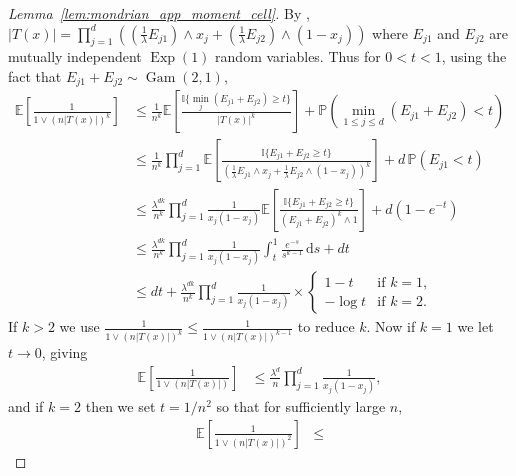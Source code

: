 \documentclass[11pt,lof]{puthesis}
\renewcommand{\P}{\ensuremath{\mathbb{P}}}
\newcommand{\E}{\ensuremath{\mathbb{E}}}
\newcommand{\I}{\ensuremath{\mathbb{I}}}
\DeclareMathOperator{\Gam}{Gam}
\DeclareMathOperator{\Exp}{Exp}
\newcommand{\diff}[1]{\,\mathrm{d}#1}
\theoremstyle{break}
\theoremstyle{proof}
\newtheorem{proof}{Proof}
\begin{document}
\begin{proof}[Lemma~\ref{lem:mondrian_app_moment_cell}]

  By \citet[Proposition~1]{mourtada2020minimax},
  $|T(x)| = \prod_{j=1}^{d}
  \left(
    \left(\frac{1}{\lambda} E_{j1} \right) \wedge x_j
    + \left( \frac{1}{\lambda} E_{j2} \right) \wedge (1-x_j)
  \right)$
  where $E_{j1}$ and $E_{j2}$
  are mutually independent $\Exp(1)$ random variables.
  Thus for $0<t<1$,
  using the fact that $E_{j1} + E_{j2} \sim \Gam(2, 1)$,
  \begin{align*}
    \E \left[
      \frac{1}{1 \vee (n |T(x)|)^k}
    \right]
    &\leq
    \frac{1}{n^k}
    \E \left[
      \frac{\I\{\min_j (E_{j1} + E_{j2}) \geq t\}}{|T(x)|^k}
    \right]
    + \P \left(\min_{1 \leq j \leq d} (E_{j1} + E_{j2}) < t\right) \\
    &\leq
    \frac{1}{n^k}
    \prod_{j=1}^d
    \E \left[
      \frac{\I\{E_{j1} + E_{j2} \geq t\}}
      {\left(\frac{1}{\lambda} E_{j1} \wedge x_j
      + \frac{1}{\lambda} E_{j2} \wedge (1-x_j)\right)^k}
    \right]
    + d\, \P \left(E_{j1} < t\right) \\
    &\leq
    \frac{\lambda^{d k}}{n^k}
    \prod_{j=1}^d
    \frac{1}{x_j(1-x_j)}
    \E \left[
      \frac{\I\{E_{j1} + E_{j2} \geq t\}}
      {(E_{j1} + E_{j2})^k \wedge 1}
    \right]
    + d (1 - e^{-t}) \\
    &\leq
    \frac{\lambda^{d k}}{n^k}
    \prod_{j=1}^d
    \frac{1}{x_j(1-x_j)}
    \int_{t}^{1}
    \frac{e^{-s}}{s^{k-1}}
    \diff s
    + d t \\
    &\leq
    d t
    + \frac{\lambda^{d k}}{n^k}
    \prod_{j=1}^d
    \frac{1}{x_j(1-x_j)}
    \times
    \begin{cases}
      1-t & \text{if } k = 1, \\
      -\log t & \text{if } k = 2.
    \end{cases}
  \end{align*}
  If $k>2$ we use
  $\frac{1}{1 \vee (n |T(x)|)^k} \leq \frac{1}{1 \vee (n |T(x)|)^{k-1}}$
  to reduce $k$. Now if $k = 1$ we let $t \to 0$, giving
  \begin{align*}
    \E \left[
      \frac{1}{1 \vee (n |T(x)|)}
    \right]
    &\leq
    \frac{\lambda^d}{n}
    \prod_{j=1}^d
    \frac{1}{x_j(1-x_j)},
  \end{align*}
  and if $k = 2$ then we set $t = 1/n^2$ so that for
  sufficiently large $n$,
  \begin{align*}
    \E \left[
      \frac{1}{1 \vee (n |T(x)|)^2}
    \right]
    &\leq

\end{align*}
\end{proof}
\end{document}

